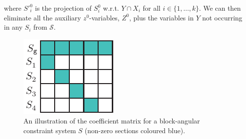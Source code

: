 \documentclass[citeauthoryear]{llncs}
\begin{document}
where $S'^0_i$ is the projection of $S^0_i$ w.r.t. $Y\cap X_i$ for all $i\in\{1,\ldots, k\}$.
We can then eliminate all the auxiliary $z^0$-variables, $Z^0$, plus the variables in $Y$ not occurring in any $S_i$ from $\mathcal{S}$. 
\begin{figure}[htbp]
	\centering
		\includegraphics{figures/blockStructure.pdf}
	\caption{An illustration of the coefficient matrix for a block-angular constraint system $S$ (non-zero sections coloured blue).}
	\label{fig:decomp}
\end{figure}
\end{document}
